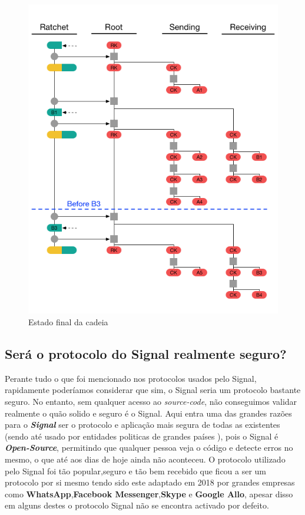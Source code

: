 \begin{figure}[H]
\begin{center}
\includegraphics[width=12cm]{img/DR5.png}
\caption{Estado final da cadeia}
\label{diagram:DR5} 
\centering
\end{center}
\end{figure}

\subsection{Será o protocolo do Signal realmente seguro?}
Perante tudo o que foi mencionado nos protocolos usados pelo Signal, rapidamente poderíamos considerar que sim, o Signal seria um protocolo bastante seguro. No entanto, sem qualquer acesso ao \textit{source-code}, não conseguimos validar realmente o quão solido e seguro é o Signal. Aqui entra uma das grandes razões para o \textbf{\textit{Signal}} ser o protocolo e aplicação mais segura de todas as existentes (sendo até usado por entidades politicas de grandes países \cite{politicsSignal}), pois o Signal é \textbf{\textit{Open-Source}}, permitindo que qualquer pessoa veja o código e detecte erros no mesmo, o que até aos dias de hoje ainda não aconteceu. O protocolo utilizado pelo Signal foi tão popular,seguro e tão bem recebido que ficou a ser um protocolo por si mesmo tendo sido este adaptado em 2018 por grandes empresas como \textbf{WhatsApp},\textbf{Facebook Messenger},\textbf{Skype} e \textbf{Google Allo}, apesar disso em alguns destes o protocolo Signal não se encontra activado por defeito.

